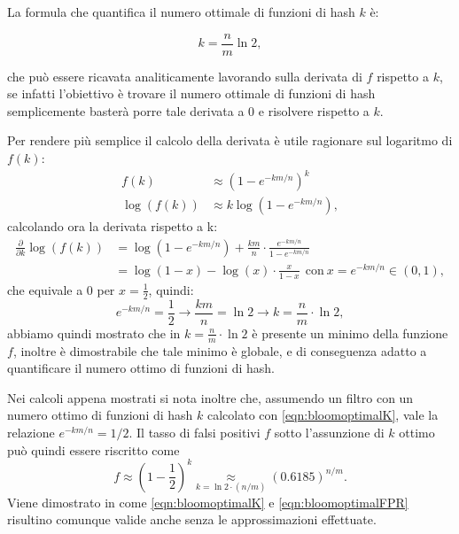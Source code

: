 \documentclass[../../main.tex]{subfiles}
\begin{document}
La formula che quantifica il numero ottimale di funzioni di hash $k$ è:

\begin{equation}
    k = \frac{n}{m}\ln{2} ,
    \label{eqn:bloomoptimalK}
\end{equation}

che può essere ricavata analiticamente lavorando sulla derivata di $f$ rispetto a $k$,  se infatti l'obiettivo è trovare il numero ottimale di funzioni di hash semplicemente basterà porre tale derivata a 0 e risolvere rispetto a $k$.

Per rendere più semplice il calcolo della derivata è utile ragionare sul logaritmo di $f(k)$:
\begin{align*}
    f(k) & \approx \left(1 - e^{-km/n}\right)^k\\
    \log(f(k)) & \approx k \log\left(1 - e^{-km/n}\right),
\end{align*}
calcolando ora la derivata rispetto a k:
\begin{align*}
    \frac{\partial}{\partial k} \log(f(k)) & = \log(1 - e^{-km/n}) + \frac{km}{n} \cdot \frac{e^{-km/n}}{1 - e^{-km/n}}\\
    &= \log(1 - x) - \log(x) \cdot \frac{x}{1 - x} \ \ \text{con} \ x = e^{-km/n} \in (0,1),
\end{align*}
che equivale a 0 per $ x = \frac{1}{2}$, quindi: 
\[e^{-km/n} = \frac{1}{2} \rightarrow \frac{km}{n} = \ln2 \rightarrow k = \frac{n}{m}\cdot \ln2 ,\]
abbiamo quindi mostrato che in $k = \frac{n}{m}\cdot \ln2$ è presente un minimo della funzione $f$, inoltre è dimostrabile che tale minimo è globale, e di conseguenza adatto a quantificare il numero ottimo di funzioni di hash.

Nei calcoli appena mostrati si nota inoltre che, assumendo un filtro con un numero ottimo di funzioni di hash $k$ calcolato con \eqref{eqn:bloomoptimalK}, vale la relazione $e^{-km/n} = 1/2$. Il tasso di falsi positivi $f$ sotto l'assunzione di $k$ ottimo può quindi essere riscritto come
\begin{equation}
f \approx \left(1 - \frac{1}{2}\right)^k \underset{k = \ln{2} \cdot \left(n/m\right)}{\approx} (0.6185)^{n/m}.
\label{eqn:bloomoptimalFPR}
\end{equation}
Viene dimostrato in \cite{Broder2005} come \eqref{eqn:bloomoptimalK} e \eqref{eqn:bloomoptimalFPR} risultino comunque valide anche senza le approssimazioni effettuate.
\end{document}
